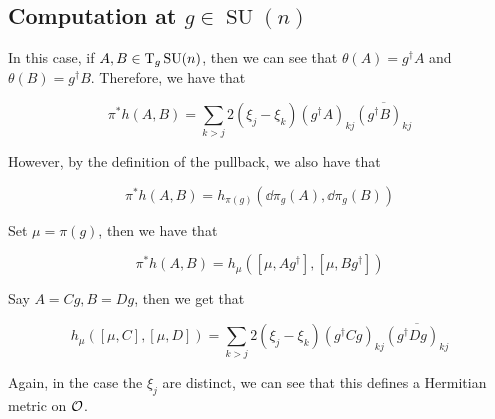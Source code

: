 \documentclass{article}
\DeclareMathOperator{\SU}{SU}
\begin{document}
\subsection{Computation at \(g \in \SU(n)\)}

In this case, if \(A, B \in \TT_g\SU(n)\), then we can see that \(\theta(A) = g^\dagger A\) and \(\theta(B) = g^\dagger B\). Therefore, we have that

\[\pi^*h(A, B) = \sum_{k > j}2(\xi_j - \xi_k)(g^\dagger A)_{kj}\overline{(g^\dagger B)_{kj}}\]

However, by the definition of the pullback, we also have that

\[\pi^*h(A, B) = h_{\pi(g)}(\dd \pi_g(A), \dd\pi_g(B))\]

Set \(\mu = \pi(g)\), then we have that

\[\pi^*h(A, B) = h_\mu([\mu, Ag^\dagger], [\mu, Bg^\dagger])\]

Say \(A = Cg, B = Dg\), then we get that

\[h_\mu([\mu, C], [\mu, D]) = \sum_{k > j}2(\xi_j - \xi_k)(g^\dagger Cg)_{kj}\overline{(g^\dagger Dg)_{kj}}\]

Again, in the case the \(\xi_j\) are distinct, we can see that this defines a Hermitian metric on \(\mathcal{O}\).
\end{document}
